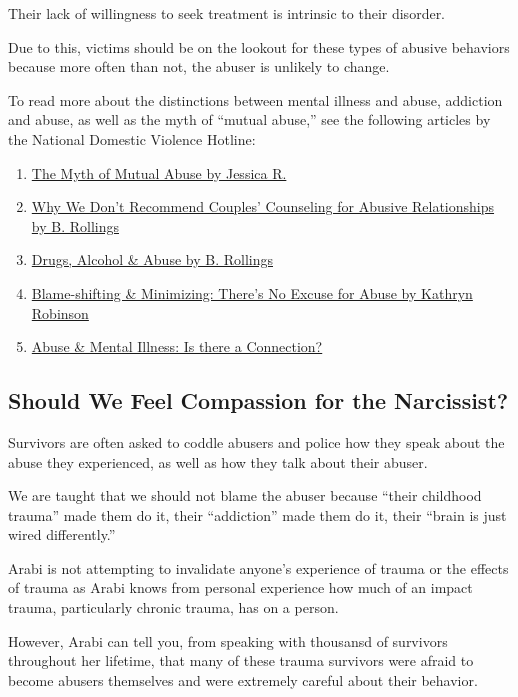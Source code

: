 \documentclass[oneside]{book}
\numberwithin{equation}{section}
\begin{document}
Their lack of willingness to seek treatment is intrinsic to their disorder.

Due to this, victims should be on the lookout for these types of abusive behaviors because more often than not, the abuser is unlikely to change.

%
To read more about the distinctions between mental illness and abuse, addiction and abuse, as well as the myth of ``mutual abuse,'' see the following articles by the National Domestic Violence Hotline:
\begin{enumerate}
    \item \href{http://www.thehotline.org/2016/01/myth-of-mutual-abuse/}{The Myth of Mutual Abuse by Jessica R.}
    \item \href{http://www.thehotline.org/2014/08/why-we-dont-recommend-couples-counseling-for-abusive-relationships/}{Why We Don't Recommend Couples' Counseling for Abusive Relationships by B. Rollings}
    \item \href{http://www.thehotline.org/2015/03/drugs-alcohol-and-abuse/}{Drugs, Alcohol \& Abuse by B. Rollings}
    \item \href{http://www.thehotline.org/2014/01/blame-shifting-and-minimizing-theres-no-excuse-for-abuse/}{Blame-shifting \& Minimizing: There's No Excuse for Abuse by Kathryn Robinson}
    \item \href{http://www.thehotline.org/2015/05/abuse-and-mental-illness-is-there-a-connection/}{Abuse \& Mental Illness: Is there a Connection?}
\end{enumerate}

\subsection{Should We Feel Compassion for the Narcissist?}
Survivors are often asked to coddle abusers and police how they speak about the abuse they experienced, as well as how they talk about their abuser.

We are taught that we should not blame the abuser because ``their childhood trauma'' made them do it, their ``addiction'' made them do it, their ``brain is just wired differently.''

Arabi is not attempting to invalidate anyone's experience of trauma or the effects of trauma as Arabi knows from personal experience how much of an impact trauma, particularly chronic trauma, has on a person.

%
However, Arabi can tell you, from speaking with thousansd of survivors throughout her lifetime, that many of these trauma survivors were afraid to become abusers themselves and were extremely careful about their behavior.
\end{document}
